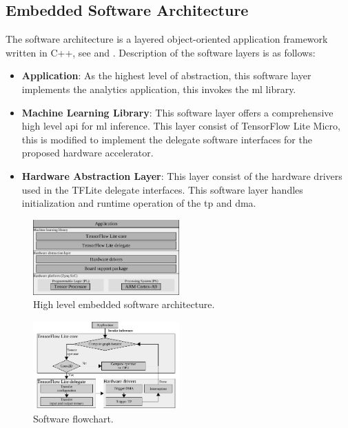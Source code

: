 \FloatBarrier
\subsection{Embedded Software Architecture}
The software architecture is a layered object-oriented application framework written in C++, see  and . Description of the software layers is as follows:
\begin{itemize}
	\item \textbf{Application}: As the highest level of abstraction, this software layer implements the analytics application, this invokes the \gls{ml} library.
	\item \textbf{Machine Learning Library}: This software layer offers a comprehensive high level \gls{api} for \gls{ml} inference. This layer consist of TensorFlow Lite Micro, this is modified to implement the delegate software interfaces for the proposed hardware accelerator.
	\item \textbf{Hardware Abstraction Layer}: This layer consist of the hardware drivers used in the TFLite delegate interfaces. This software layer handles initialization and runtime operation of the \gls{tp} and \gls{dma}.
\end{itemize}

\begin{figure}[h!]
	\centering
	\includegraphics[width=0.5\textwidth]{./chapters/cnn_accelerator/figures/sw_stack.pdf}
	\caption{High level embedded software architecture.}
	\label{fig:sw_stack}
\end{figure}

\begin{figure}[h!]
	\centering
	\includegraphics[width=0.5\textwidth]{./chapters/cnn_accelerator/figures/sw_stack_flowchart.pdf}
	\caption{Software flowchart.}
	\label{fig:sw_stack_flowchart}
\end{figure}


